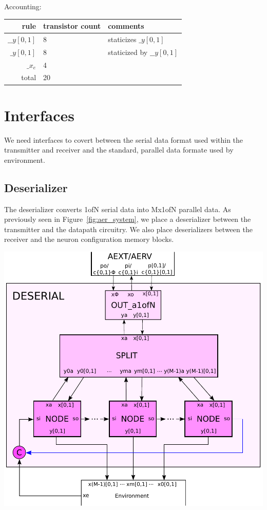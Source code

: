 \documentclass{article}
\begin{document}
\noindent
Accounting:

\begin{center}
    \begin{tabular}{|r|l|l|}
    \hline
    rule & transistor count & comments \\ \hline
    $\_\_y[0,1]$ & 8 & staticizes $\_y[0,1]$ \\ \hline
    $\_y[0,1]$ & 8 & staticized by $\_\_y[0,1]$ \\ \hline
    $\_x_e$ & 4 & \\ \hline
    \hline total & 20 & \\ \hline
    \end{tabular}
\end{center}

\section{Interfaces}

We need interfaces to covert between the serial data format used within the transmitter
and receiver and the standard, parallel data formate used by environment.

\subsection{Deserializer \label{sec:DESERIAL}}

The deserializer converts 1ofN serial data into Mx1ofN parallel data.
As previously seen in Figure~\ref{fig:aer_system}, we place a deserializer 
between the transmitter and the datapath circuitry. We also place deserializers
between the receiver and the neuron configuration memory blocks.

\begin{center}
  \includegraphics[width=.45\textwidth]{img/deserial.pdf}
\end{center}
\end{document}

